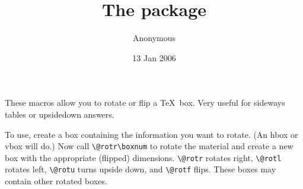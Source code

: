 \documentclass[pagesize=auto, fontsize=14pt, DIV=9, parskip=half]{scrartcl}
\title{The \pkg{rotate} package}
\author{Anonymous}
\date{13 Jan 2006}
\begin{document}
\maketitle

\noindent

These macros allow you to rotate or flip a \TeX\ box.  Very useful for
sideways tables or upsidedown answers.

To use, create a box containing the information you want to rotate.
(An hbox or vbox will do.)  Now call \verb|\@rotr\boxnum| to rotate the
material and create a new box with the appropriate (flipped) dimensions.
\verb|\@rotr| rotates right, \verb|\@rotl| rotates left, \verb|\@rotu| turns upside down, and
\verb|\@rotf| flips.  These boxes may contain other rotated boxes.
\end{document}
